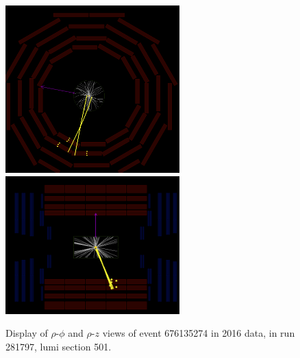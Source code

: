 \begin{figure}[htpb]
  \centering
  \includegraphics[width=0.6\textwidth]{figures/displaced/event-281797_676135274_501_RhoPhi.png}
  \includegraphics[width=0.6\textwidth]{figures/displaced/event-281797_676135274_501_RhoZ.png}
  \caption{Display of $\rho$-$\phi$ and $\rho$-$z$ views of event 676135274 in 2016 data, in run 281797, lumi section 501.}
  \label{fig:dd:event-501}
\end{figure}


